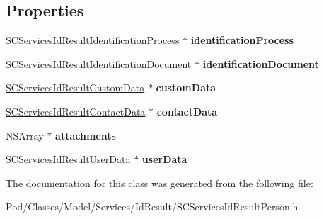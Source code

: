 \subsection*{Properties}
\begin{DoxyCompactItemize}
\item 
\hyperlink{interface_s_c_services_id_result_identification_process}{S\+C\+Services\+Id\+Result\+Identification\+Process} $\ast$ {\bfseries identification\+Process}\hypertarget{interface_s_c_services_id_result_person_a7ecdad7559e3d3b9950519fe079ed8a9}{}\label{interface_s_c_services_id_result_person_a7ecdad7559e3d3b9950519fe079ed8a9}

\item 
\hyperlink{interface_s_c_services_id_result_identification_document}{S\+C\+Services\+Id\+Result\+Identification\+Document} $\ast$ {\bfseries identification\+Document}\hypertarget{interface_s_c_services_id_result_person_a0b10679c9ab20ea78a013f3b9e7fbb63}{}\label{interface_s_c_services_id_result_person_a0b10679c9ab20ea78a013f3b9e7fbb63}

\item 
\hyperlink{interface_s_c_services_id_result_custom_data}{S\+C\+Services\+Id\+Result\+Custom\+Data} $\ast$ {\bfseries custom\+Data}\hypertarget{interface_s_c_services_id_result_person_ad7bdf444cd2fb36aa8a4c525fc42e701}{}\label{interface_s_c_services_id_result_person_ad7bdf444cd2fb36aa8a4c525fc42e701}

\item 
\hyperlink{interface_s_c_services_id_result_contact_data}{S\+C\+Services\+Id\+Result\+Contact\+Data} $\ast$ {\bfseries contact\+Data}\hypertarget{interface_s_c_services_id_result_person_aec3ad15aa3f9265c8b89dbaf9bd0985a}{}\label{interface_s_c_services_id_result_person_aec3ad15aa3f9265c8b89dbaf9bd0985a}

\item 
N\+S\+Array $\ast$ {\bfseries attachments}\hypertarget{interface_s_c_services_id_result_person_a622af64931b95339a3fddc57649d0d69}{}\label{interface_s_c_services_id_result_person_a622af64931b95339a3fddc57649d0d69}

\item 
\hyperlink{interface_s_c_services_id_result_user_data}{S\+C\+Services\+Id\+Result\+User\+Data} $\ast$ {\bfseries user\+Data}\hypertarget{interface_s_c_services_id_result_person_acb05ab6995312715b621fd5a466cc6ca}{}\label{interface_s_c_services_id_result_person_acb05ab6995312715b621fd5a466cc6ca}

\end{DoxyCompactItemize}


The documentation for this class was generated from the following file\+:\begin{DoxyCompactItemize}
\item 
Pod/\+Classes/\+Model/\+Services/\+Id\+Result/S\+C\+Services\+Id\+Result\+Person.\+h\end{DoxyCompactItemize}
